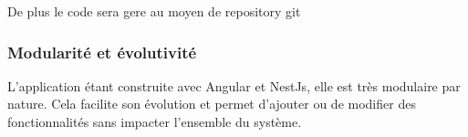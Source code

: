 De plus le code sera gere au moyen de repository git

\subsubsection{Modularité et évolutivité}

L'application étant construite avec Angular et NestJs, elle est très modulaire par nature.
Cela facilite son évolution et permet d'ajouter ou de modifier des fonctionnalités sans impacter l'ensemble du système.


